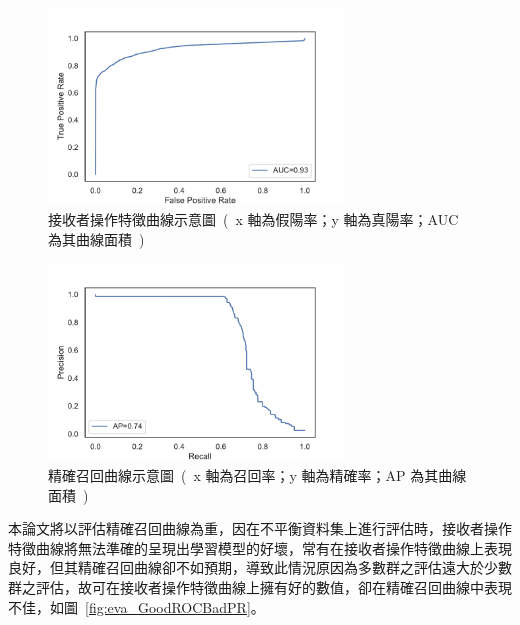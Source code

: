 \begin{figure}[!htb]
    \begin{center}
      \includegraphics[width=0.7\textwidth]{figures/evaluation/Image_ROCCurve.pdf}
      \caption[接收者操作特徵曲線示意圖]{接收者操作特徵曲線示意圖\ (\ x 軸為假陽率；y 軸為真陽率；AUC為其曲線面積\ )}
      \label{fig:eva_ROCCurve}
    \end{center}
\end{figure}

\begin{figure}[!htb]
    \begin{center}
      \includegraphics[width=0.7\textwidth]{figures/evaluation/Image_PRCurve.pdf}
      \caption[精確召回曲線示意圖]{精確召回曲線示意圖\ (\ x 軸為召回率；y 軸為精確率；AP 為其曲線面積\ )}
      \label{fig:eva_PRCurve}
    \end{center}
\end{figure}
\newpage

本論文將以評估精確召回曲線為重，因在不平衡資料集上進行評估時，接收者操作特徵曲線將無法準確的呈現出學習模型的好壞，常有在接收者操作特徵曲線上表現良好，但其精確召回曲線卻不如預期，導致此情況原因為多數群之評估遠大於少數群之評估，故可在接收者操作特徵曲線上擁有好的數值，卻在精確召回曲線中表現不佳\cite{davis2006relationship}，如圖~\ref{fig:eva_GoodROCBadPR}。

